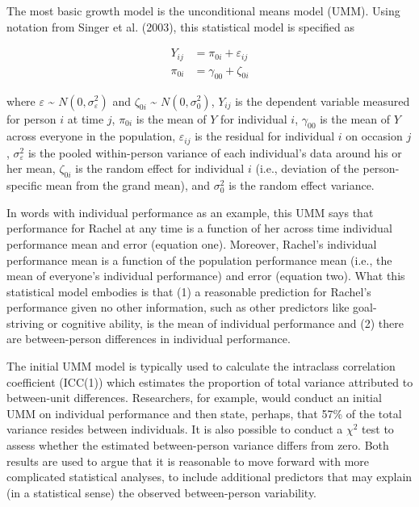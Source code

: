 \documentclass[english,,man]{apa6}
\theoremstyle{definition}
\theoremstyle{definition}
\theoremstyle{definition}
\theoremstyle{remark}
\begin{document}
The most basic growth model is the unconditional means model (UMM).
Using notation from Singer et al. (2003), this statistical model is
specified as

\begin{align}
\label{UMM}
Y_{ij} &= \pi_{0i} + \varepsilon_{ij} \\
\pi_{0i} &= \gamma_{00} + \zeta_{0i}
\end{align}

\noindent where \(\varepsilon\) \textasciitilde{}
\(N(0, \sigma_{\varepsilon}^2)\) and \(\zeta_{0i}\) \textasciitilde{}
\(N(0, \sigma_{0}^2)\), \(Y_{ij}\) is the dependent variable measured
for person \(i\) at time \(j\), \(\pi_{0i}\) is the mean of \(Y\) for
individual \(i\), \(\gamma_{00}\) is the mean of \(Y\) across everyone
in the population, \(\varepsilon_{ij}\) is the residual for individual
\(i\) on occasion \(j\), \(\sigma_{\varepsilon}^2\) is the pooled
within-person variance of each individual's data around his or her mean,
\(\zeta_{0i}\) is the random effect for individual \(i\) (i.e.,
deviation of the person-specific mean from the grand mean), and
\(\sigma_0^2\) is the random effect variance.

In words with individual performance as an example, this UMM says that
performance for Rachel at any time is a function of her across time
individual performance mean and error (equation one). Moreover, Rachel's
individual performance mean is a function of the population performance
mean (i.e., the mean of everyone's individual performance) and error
(equation two). What this statistical model embodies is that (1) a
reasonable prediction for Rachel's performance given no other
information, such as other predictors like goal-striving or cognitive
ability, is the mean of individual performance and (2) there are
between-person differences in individual performance.

The initial UMM model is typically used to calculate the intraclass
correlation coefficient (ICC(1)) which estimates the proportion of total
variance attributed to between-unit differences. Researchers, for
example, would conduct an initial UMM on individual performance and then
state, perhaps, that 57\% of the total variance resides between
individuals. It is also possible to conduct a \(\chi^2\) test to assess
whether the estimated between-person variance differs from zero. Both
results are used to argue that it is reasonable to move forward with
more complicated statistical analyses, to include additional predictors
that may explain (in a statistical sense) the observed between-person
variability.
\end{document}
